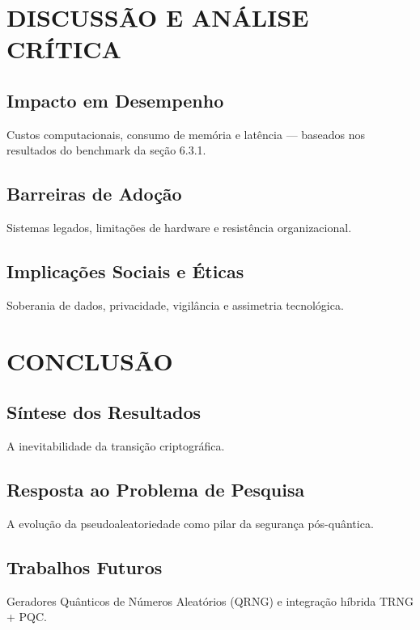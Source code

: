 \documentclass[
	12pt,				%
	openright,			%
	oneside,			%
	a4paper,			%
	portuguese,			%
	brazil				%
	]{abntex2}
\begin{document}
\chapter{DISCUSSÃO E ANÁLISE CRÍTICA} %

    \section{Impacto em Desempenho}

    Custos computacionais, consumo de memória e latência — baseados nos resultados do benchmark da seção 6.3.1.

    \section{Barreiras de Adoção}

    Sistemas legados, limitações de hardware e resistência organizacional.

    \section{Implicações Sociais e Éticas}

    Soberania de dados, privacidade, vigilância e assimetria tecnológica.

\chapter{CONCLUSÃO} %

    \section{Síntese dos Resultados}

    A inevitabilidade da transição criptográfica.

    \section{Resposta ao Problema de Pesquisa}

    A evolução da pseudoaleatoriedade como pilar da segurança pós-quântica.

    \section{Trabalhos Futuros}

    Geradores Quânticos de Números Aleatórios (QRNG) e integração híbrida TRNG + PQC.

\postextual
\end{document}
